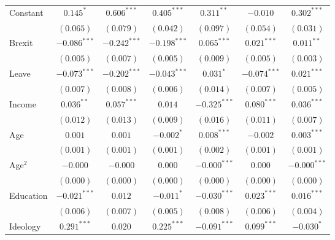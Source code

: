 \documentclass{article}
\begin{document}
\begin{table}
\begin{center}
{\begin{tabular}{l c c c c c c}
Constant                         & $0.145^{*}$    & $0.606^{***}$  & $0.405^{***}$  & $0.311^{**}$   & $-0.010$       & $0.302^{***}$  \\
                                 & $(0.065)$      & $(0.079)$      & $(0.042)$      & $(0.097)$      & $(0.054)$      & $(0.031)$      \\
Brexit                           & $-0.086^{***}$ & $-0.242^{***}$ & $-0.198^{***}$ & $0.065^{***}$  & $0.021^{***}$  & $0.011^{**}$   \\
                                 & $(0.005)$      & $(0.007)$      & $(0.005)$      & $(0.009)$      & $(0.005)$      & $(0.003)$      \\
Leave                            & $-0.073^{***}$ & $-0.202^{***}$ & $-0.043^{***}$ & $0.031^{*}$    & $-0.074^{***}$ & $0.021^{***}$  \\
                                 & $(0.007)$      & $(0.008)$      & $(0.006)$      & $(0.014)$      & $(0.007)$      & $(0.005)$      \\
Income                           & $0.036^{**}$   & $0.057^{***}$  & $0.014$        & $-0.325^{***}$ & $0.080^{***}$  & $0.036^{***}$  \\
                                 & $(0.012)$      & $(0.013)$      & $(0.009)$      & $(0.016)$      & $(0.011)$      & $(0.007)$      \\
Age                              & $0.001$        & $0.001$        & $-0.002^{*}$   & $0.008^{***}$  & $-0.002$       & $0.003^{***}$  \\
                                 & $(0.001)$      & $(0.001)$      & $(0.001)$      & $(0.002)$      & $(0.001)$      & $(0.001)$      \\
Age$^2$                            & $-0.000$       & $-0.000$       & $0.000$        & $-0.000^{***}$ & $0.000$        & $-0.000^{***}$ \\
                                 & $(0.000)$      & $(0.000)$      & $(0.000)$      & $(0.000)$      & $(0.000)$      & $(0.000)$      \\
Education                        & $-0.021^{***}$ & $0.012$        & $-0.011^{*}$   & $-0.030^{***}$ & $0.023^{***}$  & $0.016^{***}$  \\
                                 & $(0.006)$      & $(0.007)$      & $(0.005)$      & $(0.008)$      & $(0.006)$      & $(0.004)$      \\
Ideology                         & $0.291^{***}$  & $0.020$        & $0.225^{***}$  & $-0.091^{***}$ & $0.099^{***}$  & $-0.030^{*}$   \\

\end{tabular}}
\end{center}
\end{table}
\end{document}
